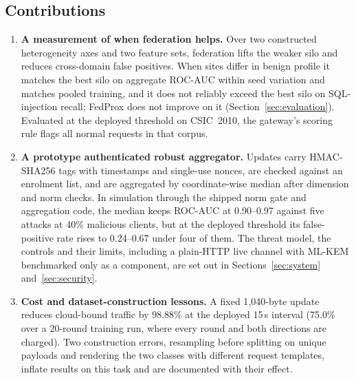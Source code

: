 \subsection{Contributions}
\begin{enumerate}
    \item \textbf{A measurement of when federation helps.} Over two constructed heterogeneity axes and two feature sets, federation lifts the weaker silo and reduces cross-domain false positives. When sites differ in benign profile it matches the best silo on aggregate ROC-AUC within seed variation and matches pooled training, and it does not reliably exceed the best silo on SQL-injection recall; FedProx does not improve on it (Section~\ref{sec:evaluation}). Evaluated at the deployed threshold on CSIC~2010, the gateway's scoring rule flags all normal requests in that corpus.
    \item \textbf{A prototype authenticated robust aggregator.} Updates carry HMAC-SHA256 tags with timestamps and single-use nonces, are checked against an enrolment list, and are aggregated by coordinate-wise median after dimension and norm checks. In simulation through the shipped norm gate and aggregation code, the median keeps ROC-AUC at 0.90--0.97 against five attacks at 40\% malicious clients, but at the deployed threshold its false-positive rate rises to 0.24--0.67 under four of them. The threat model, the controls and their limits, including a plain-HTTP live channel with ML-KEM benchmarked only as a component, are set out in Sections~\ref{sec:system} and~\ref{sec:security}.
    \item \textbf{Cost and dataset-construction lessons.} A fixed 1{,}040-byte update reduces cloud-bound traffic by 98.88\% at the deployed 15\,s interval (75.0\% over a 20-round training run, where every round and both directions are charged). Two construction errors, resampling before splitting on unique payloads and rendering the two classes with different request templates, inflate results on this task and are documented with their effect.
\end{enumerate}
